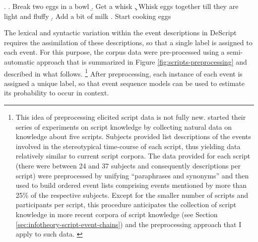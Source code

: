 \ex. \a. Break two eggs in a bowl
\b. Get a whisk
\c. Whisk eggs together till they are light and fluffy
\d. Add a bit of milk
\e. Start cooking eggs

The lexical and syntactic variation within the event descriptions in DeScript requires the assimilation of these descriptions, so that a single label is assigned to each event. For this purpose, the corpus data were pre-processed using a semi-automatic approach that is summarized in Figure \ref{fig:scripts-preprocessing} and described in what follows.%
%
\footnote{This idea of preprocessing elicited script data is not fully new. \citet{bower.etal1979} started their series of experiments on script knowledge by collecting natural data on knowledge about five scripts. Subjects provided list descriptions of the events involved in the stereotypical time-course of each script, thus yielding data relatively similar to current script corpora. The data provided for each script (there were between 24 and 37 subjects and consequently descriptions per script) were preprocessed by unifying ``paraphrases and synonyms'' \citep[181]{bower.etal1979} and then used to build ordered event lists comprising events mentioned by more than 25\% of the respective subjects. Except for the smaller number of scripts and participants per script, this procedure anticipates the collection of script knowledge in more recent corpora of script knowledge (see Section \ref{sec:infotheory-script-event-chains}) and the preprocessing approach that I apply to such data.%
\label{fn:bower-etal-ex1}}\afterfn%
%
After preprocessing, each instance of each event is assigned a unique label, so that event sequence models can be used to estimate its probability to occur in context.

